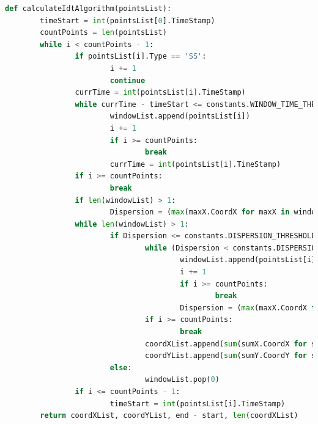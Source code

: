\begin{lstlisting}[language=Python, caption=Kod algorytmu I-DT, label={lst:idt}]
def calculateIdtAlgorithm(pointsList):
        timeStart = int(pointsList[0].TimeStamp)
        countPoints = len(pointsList)
        while i < countPoints - 1:
                if pointsList[i].Type == 'SS':
                        i += 1
                        continue
                currTime = int(pointsList[i].TimeStamp)
                while currTime - timeStart <= constants.WINDOW_TIME_THRESHOLD:
                        windowList.append(pointsList[i])
                        i += 1
                        if i >= countPoints:
                                break
                        currTime = int(pointsList[i].TimeStamp)
                if i >= countPoints:
                        break
                if len(windowList) > 1:
                        Dispersion = (max(maxX.CoordX for maxX in windowList) - min(minX.CoordX for minX in windowList)) + (max(maxY.CoordY for maxY in windowList) - min(minY.CoordY for minY in windowList))
                while len(windowList) > 1:
                        if Dispersion <= constants.DISPERSION_THRESHOLD and len(windowList) > 1:
                                while (Dispersion < constants.DISPERSION_THRESHOLD):
                                        windowList.append(pointsList[i])
                                        i += 1
                                        if i >= countPoints:
                                                break
                                        Dispersion = (max(maxX.CoordX for maxX in windowList) - min(minX.CoordX for minX in windowList)) + (max(maxY.CoordY for maxY in windowList) - min(minY.CoordY for minY in windowList))
                                if i >= countPoints:
                                        break
                                coordXList.append(sum(sumX.CoordX for sumX in windowList) / len(windowList))
                                coordYList.append(sum(sumY.CoordY for sumY in windowList) / len(windowList))
                        else:
                                windowList.pop(0)
                if i <= countPoints - 1:
                        timeStart = int(pointsList[i].TimeStamp)
        return coordXList, coordYList, end - start, len(coordXList)
\end{lstlisting}
